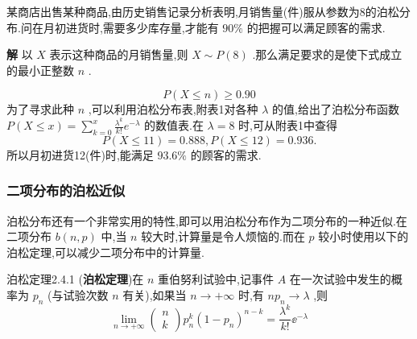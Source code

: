 \begin{example}\label{exam:2.4.5}
	某商店出售某种商品,由历史销售记录分析表明,月销售量(件)服从参数为8的泊松分布.问在月初进货时,需要多少库存量,才能有 $ 90\% $ 的把握可以满足顾客的需求.
	
	\textbf{解}
	以 $ X $ 表示这种商品的月销售量,则 $ X \sim P(8) $ .那么满足要求的是使下式成立的最小正整数 $ n $ .
	
	\[
	P(X \leqslant n) \geqslant 0.90
	\]
	为了寻求此种 $ n $ ,可以利用泊松分布表,附表1对各种 $ \lambda $ 的值,给出了泊松分布函数 $ P(X \leqslant x)=\sum_{k=0}^{x} \tfrac{\lambda^{k}}{k !} e^{-\lambda} $ 的数值表.在 $ \lambda=8 $ 时,可从附表1中查得
	\[
	P(X \leqslant 11)=0.888, P(X \leqslant 12)=0.936 .
	\]
	所以月初进货12(件)时,能满足 $ 93.6\% $ 的顾客的需求.
\end{example}

\subsubsection{二项分布的泊松近似}

泊松分布还有一个非常实用的特性,即可以用泊松分布作为二项分布的一种近似.在二项分布 $ b(n,p) $ 中,当 $ n $ 较大时,计算量是令人烦恼的.而在 $ p $ 较小时使用以下的泊松定理,可以减少二项分布中的计算量.

\begin{theorem}{泊松定理}{2.4.1}
	(\textbf{泊松定理})在 $ n $ 重伯努利试验中,记事件 $ A $ 在一次试验中发生的概率为 $ p_{n} $ (与试验次数 $ n $ 有关),如果当 $ n \rightarrow+\infty $ 时,有 $ n p_{n} \rightarrow \lambda $ ,则
	\begin{equation}
	\lim _{n \rightarrow+\infty} \left( \begin{array}{l}{n} \\ {k}\end{array}\right) p_{n}^{k}\left(1-p_{n}\right)^{n-k}=\frac{\lambda^{k}}{k !} \ee ^{-\lambda} \label{eq:2.4.4}
	\end{equation}
	
\end{theorem}

